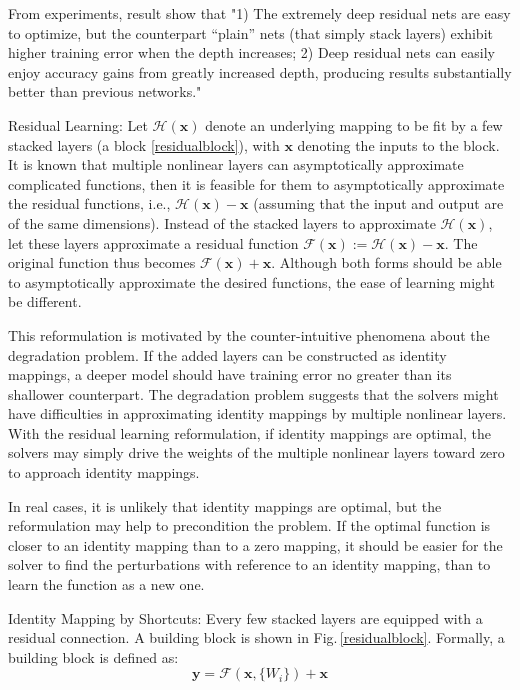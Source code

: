 From experiments, result show that "1) The extremely deep residual nets are easy to optimize, but the counterpart “plain” nets (that simply stack layers) exhibit higher training error when the depth increases; 2) Deep residual nets can easily enjoy accuracy gains from greatly increased depth, producing results substantially better than previous networks." \citep{resnet}

Residual Learning:
Let $\mathcal{H}(\mathbf{x})$ denote an underlying mapping to be fit by a few stacked layers (a block \ref{residualblock}), with $\mathbf{x}$ denoting the inputs to the block. It is known that multiple nonlinear layers can asymptotically approximate complicated functions, then it is feasible for them to asymptotically approximate the residual functions, i.e., $\mathcal{H}(\mathbf{x}) - \mathbf{x}$ (assuming that the input and output are of the same dimensions). Instead of the stacked layers to approximate $\mathcal{H}(\mathbf{x})$, let these layers approximate a residual function $\mathcal{F}(\mathbf{x}) := \mathcal{H}(\mathbf{x})-\mathbf{x}$. The original function thus becomes $\mathcal{F}(\mathbf{x})+\mathbf{x}$. Although both forms should be able to asymptotically approximate the desired functions, the ease of learning might be different. 

This reformulation is motivated by the counter-intuitive phenomena about the degradation problem. If the added layers can be constructed as identity mappings, a deeper model should have training error no greater than its shallower counterpart. The degradation problem suggests that the solvers might have difficulties in approximating identity mappings by multiple nonlinear layers. With the residual learning reformulation, if identity mappings are optimal, the solvers may simply drive the weights of the multiple nonlinear layers toward zero to approach identity mappings. 

In real cases, it is unlikely that identity mappings are optimal, but the reformulation may help to precondition the problem. If the optimal function is closer to an identity mapping than to a zero mapping, it should be easier for the solver to find the perturbations with reference to an identity mapping, than to learn the function as a new one.

Identity Mapping by Shortcuts: 
Every few stacked layers are equipped with a residual connection. A building block is shown in Fig.\,\ref{residualblock}. Formally, a building block is defined as: 
\begin{equation} \label{eq1}
\mathbf{y} = \mathcal{F} (\mathbf{x}, \{W_i\}) + \mathbf{x}
\end{equation}

